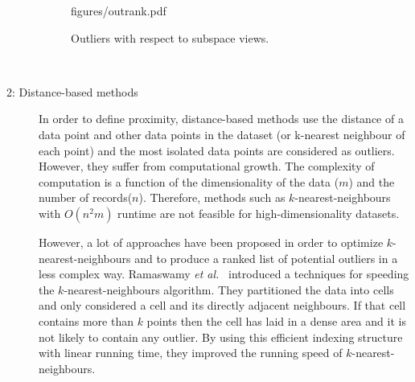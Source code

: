 \begin{description}
\begin{figure}[!htbp]
{		{figures/outrank.pdf}
	}
	\caption{Outliers with respect to subspace views.
		\label{fig:outrank}}
\end{figure}
\\
	\item [2: Distance-based methods]
	In order to define proximity, distance-based methods use the  distance of a data point and other data points in the dataset (or k-nearest neighbour of each point) and the most isolated data points are considered as outliers. However, they suffer from computational growth. The complexity of computation is a function of the dimensionality of the data ($m$) and the number of records($n$). Therefore, methods such as $k$-nearest-neighbours with $O(n^2m)$ runtime are not feasible for high-dimensionality datasets. 
	
	However, a lot of approaches have been proposed in order to optimize $k$-nearest-neighbours 
	and to produce a ranked list of potential outliers in a less complex way. Ramaswamy {\em et al.}~\cite{Ramaswamy2000} introduced a techniques for speeding the $k$-nearest-neighbours algorithm.  They partitioned the data into cells and only considered a cell and its directly adjacent neighbours. If that cell contains more than $k$ points then the cell has laid in a dense area and it is not likely to contain any outlier.  By using this efficient indexing structure with linear running time, they improved the running speed of  $k$-nearest-neighbours.
	
	
		

\end{description}
